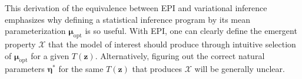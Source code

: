 \documentclass[11pt]{article}
\DeclareMathOperator*{\argmax}{argmax}
\begin{document}
This derivation of the equivalence between EPI and variational inference emphasizes why defining a statistical inference program by its mean parameterization $\bm{\mu}_{\text{opt}}$ is so useful.
With EPI, one can clearly define the emergent property $\mathcal{X}$ that the model of interest should produce through intuitive selection of $\bm{\mu}_{\text{opt}}$ for a given $T(\mathbf{z})$.
Alternatively, figuring out the correct natural parameters $\bm{\eta}^*$ for the same $T(\mathbf{z})$ that produces $\mathcal{X}$ will be generally unclear.

\end{document}
